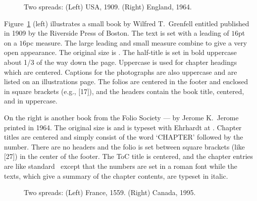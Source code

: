 \documentclass[10pt,a4paper,extrafontsizes]{memoir}
\begin{document}
\begin{figure}
\centering
\begin{minipage}[b]{\pwlayi}
\end{minipage}
\hfill
\begin{minipage}[b]{\pwlayi}
\end{minipage}
\caption[Two spreads: USA, 1909 and England, 1964.]%
        {Two spreads: (Left) USA, 1909.
         (Right) England, 1964.} \label{fb:2}
\end{figure}

\begin{paracol}{2}
\switchEng
    Figure~\ref{fb:2} (left) illustrates a small book by Wilfred T.~Grenfell
entitled  published in 1909 by the Riverside
Press of Boston. The text is set with a leading 
of $16$pt on a $16$pc 
measure. The large leading and small measure combine to give a very 
open appearance. The original size is . 
 The half-title is set in 
bold uppercase about 1/3
of the way down the page. Uppercase is used for chapter
headings which are centered. Captions for the photographs
are also uppercase and are listed on an illustrations page. 
The folios are
centered in the footer and enclosed in square 
brackets (e.g., [17]), and the
headers contain the book title, centered, 
and in uppercase.



On the right is another book from the
Folio Society ---  
by Jerome K.~Jerome printed
in 1964. The original size is  and is typeset with
Ehrhardt at . 
Chapter titles are
centered and simply consist of  the word `CHAPTER' followed by the number.
There are no headers and the folio 
is set between square brackets (like [27])
in the center of the footer. The ToC
title is centered, and the chapter entries are like standard \ltx\ except
that the numbers are set in a roman font while the texts, which give a 
summary of the chapter contents, are typeset in italic.
\end{paracol}

\begin{figure}
\centering
\begin{minipage}[b]{\pwlayi}
\end{minipage}
\hfill
\begin{minipage}[b]{\pwlayi}
\end{minipage}
\caption[Two spreads: France, 1559 and Canada, 1995]%
        {Two spreads: (Left) France, 1559.
         (Right) Canada, 1995.} \label{fb:3}
\end{figure}
\end{document}
